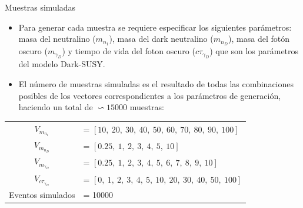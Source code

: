 \begin{frame}{Muestras simuladas}
    \begin{itemize}
        \item Para generar cada muestra se requiere especificar los siguientes par\'ametros: masa del neutralino ($m_{n_{1}}$), masa del dark neutralino ($m_{n_{D}}$), masa del fot\'on oscuro ($m_{\gamma_{D}}$) y tiempo de vida del foton oscuro ($c\tau_{\gamma_{D}}$) que son los par\'ametros del modelo Dark-SUSY. 
        \item El n\'umero de muestras simuladas es el resultado de todas las combinaciones posibles de los vectores correspondientes a los par\'ametros de generaci\'on, haciendo un total de $\backsim 15 000$ muestras:
    \end{itemize}

\begin{table}
\begin{footnotesize}
\begin{tabular}{|cl|}
\hline
$V_{m_{n_{1}}}$ & = $[10, ~20, ~30, ~40, ~50, ~60, ~70, ~80, ~90, ~100]$\\
$V_{m_{n_{D}}}$ & = $[0.25, ~1, ~2, ~3, ~4, ~5, ~10]$\\
$V_{m_{\gamma_{D}}}$ & = $[0.25, ~1, ~2, ~3, ~4, ~5, ~6, ~7, ~8, ~9, ~10]$\\
$V_{c\tau_{\gamma_{D}}}$ & = $[0, ~1, ~2, ~3, ~4, ~5, ~10, ~20, ~30, ~40, ~50, ~100]$\\
Eventos simulados &  = 10000\\
\hline
\hline
\end{tabular}
\end{footnotesize}
\end{table}
\end{frame}






